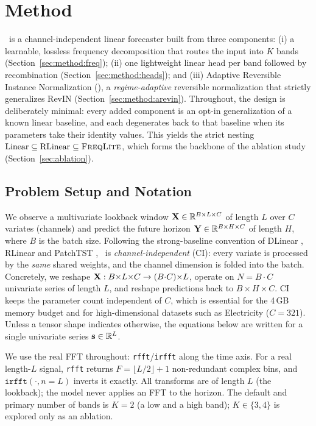\section{Method}
\label{sec:method}

\method\ is a channel-independent linear forecaster built from three components:
(i) a learnable, lossless frequency decomposition that routes the input into $K$
bands (Section~\ref{sec:method:freq}); (ii) one lightweight linear head per band
followed by recombination (Section~\ref{sec:method:heads}); and (iii) Adaptive
Reversible Instance Normalization (\arevin), a \emph{regime-adaptive} reversible
normalization that strictly generalizes RevIN \citep{kim2022revin}
(Section~\ref{sec:method:arevin}). Throughout, the design is deliberately
minimal: every added component is an opt-in generalization of a known linear
baseline, and each degenerates back to that baseline when its parameters take
their identity values. This yields the strict nesting
$\text{Linear} \subseteq \text{RLinear} \subseteq \textsc{FreqLite}$, which forms the
backbone of the ablation study (Section~\ref{sec:ablation}).

\subsection{Problem Setup and Notation}
\label{sec:method:setup}

We observe a multivariate lookback window
$\mathbf{X} \in \mathbb{R}^{B \times L \times C}$ of length $L$ over $C$ variates (channels)
and predict the future horizon $\mathbf{Y} \in \mathbb{R}^{B \times H \times C}$ of length
$H$, where $B$ is the batch size. Following the strong-baseline convention of
DLinear \citep{zeng2023dlinear}, RLinear \citep{li2023rlinear} and PatchTST
\citep{nie2023patchtst}, \method\ is \emph{channel-independent} (CI): every
variate is processed by the \emph{same} shared weights, and the channel
dimension is folded into the batch. Concretely, we reshape
$\mathbf{X} : B{\times}L{\times}C \to (B{\cdot}C){\times}L$, operate on
$N = B{\cdot}C$ univariate series of length $L$, and reshape predictions back
to $B{\times}H{\times}C$. CI keeps the parameter count independent of $C$,
which is essential for the 4\,GB memory budget and for high-dimensional
datasets such as Electricity ($C{=}321$). Unless a tensor shape indicates
otherwise, the equations below are written for a single univariate series
$\mathbf{s} \in \mathbb{R}^{L}$.

We use the real FFT throughout: \texttt{rfft}/\texttt{irfft} along the time
axis. For a real length-$L$ signal, \texttt{rfft} returns
$F = \lfloor L/2 \rfloor + 1$ non-redundant complex bins, and
$\texttt{irfft}(\cdot, n{=}L)$ inverts it exactly. All transforms are of length
$L$ (the lookback); the model never applies an FFT to the horizon. The default
and primary number of bands is $K{=}2$ (a low and a high band); $K \in \{3,4\}$
is explored only as an ablation.

